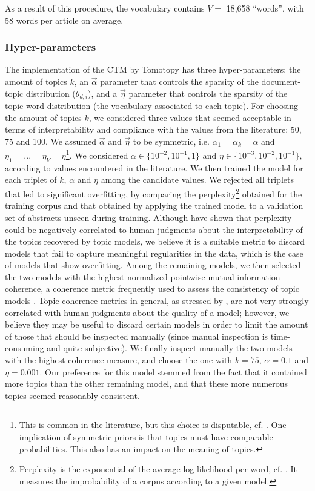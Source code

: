 \documentclass[smallextended]{svjour3}
\begin{document}
As a result of this procedure, the vocabulary contains $V=$ 18,658 ``words'', with 58 words per article on average.

\subsubsection{\label{appendix:hyper_parameter}Hyper-parameters}

The implementation of the CTM by Tomotopy \citep{tomotopy} has three hyper-parameters: the amount of topics $k$, an $\vec{\alpha}$ parameter that controls the sparsity of the document-topic distribution ($\theta_{d,i}$), and a $\vec{\eta}$ parameter that controls the sparsity of the topic-word distribution (the vocabulary associated to each topic).
For choosing the amount of topics $k$, we considered three values that seemed acceptable in terms of interpretability and compliance with the values from the literature: 50, 75 and 100.
We assumed $\vec{\alpha}$ and $\vec{\eta}$ to be symmetric, i.e. $\alpha_1 = \alpha_k = \alpha$ and $\eta_1 = ... = \eta_V = \eta$\footnote{This is common in the literature, but this choice is disputable, cf. \citealt{Wallach2009}. One implication of symmetric priors is that topics must have comparable probabilities. This also has an impact on the meaning of topics.}. We considered  $\alpha \in \{10^{-2},10^{-1},1\}$ and $\eta \in \{10^{-3},10^{-2},10^{-1}\}$, according to values encountered in the literature.
We then trained the model for each triplet of $k$, $\alpha$ and $\eta$ among the candidate values. We rejected all triplets that led to significant overfitting, by comparing the perplexity\footnote{Perplexity is the exponential of the average log-likelihood per word, cf. \citealt{Blei2003}. It measures the improbability of a corpus according to a given model.} obtained for the training corpus and that obtained by applying the trained model to a validation set of abstracts unseen during training.
Although \citet{Chang2009} have shown that perplexity could be negatively correlated to human judgments about the interpretability of the topics recovered by topic models, we believe it is a suitable metric to discard models that fail to capture meaningful regularities in the data, which is the case of models that show overfitting. Among the remaining models, we then selected the two models with the highest normalized pointwise mutual information coherence, a coherence metric frequently used to assess the consistency of topic models \citep{hoyle2021is}. Topic coherence metrics in general, as stressed by \citeauthor{hoyle2021is}, are not very strongly correlated with human judgments about the quality of a model; however, we believe they may be useful to discard certain models in order to limit the amount of those that should be inspected manually (since manual inspection is time-consuming and quite subjective). We finally inspect manually the two models with the highest coherence measure, and choose the one with $k=75$, $\alpha=0.1$ and $\eta=0.001$. Our preference for this model stemmed from the fact that it contained more topics than the other remaining model, and that these more numerous topics seemed reasonably consistent.
\end{document}
